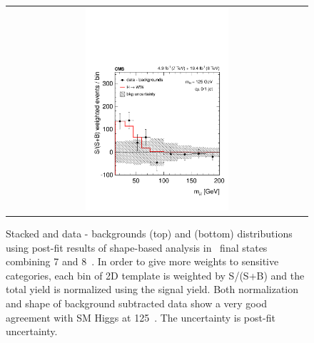 \begin{figure}[htp]
\begin{tabular}{c}
\includegraphics[width=0.49\textwidth]{figures/dataminusbkg_mll_1dweight.pdf} 
\end{tabular} 
\caption{Stacked and data - backgrounds 
\mT(top) and \mll(bottom) distributions using post-fit results 
of shape-based analysis
in \DF\ final states combining 7 and 8~\TeV.
In order to give more weights to sensitive categories, each bin of 2D 
template is weighted by S/(S+B) and the total yield is normalized using the signal yield. 
Both normalization and shape of background subtracted data show a very good agreement 
with SM Higgs at 125~\GeV.
The uncertainty is post-fit uncertainty.} 
\label{fig:post1Dprojection_1dweight} 
\end{figure} 


